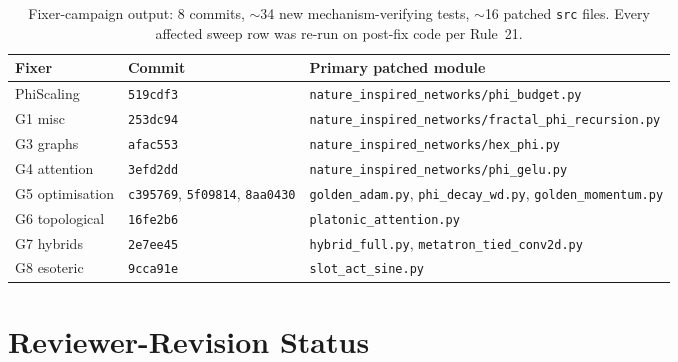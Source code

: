 \documentclass{article}
\begin{document}
\begin{table}[h!]
\small\centering
\caption{Fixer-campaign output: 8 commits, $\sim$34 new
mechanism-verifying tests, $\sim$16 patched \texttt{src} files. Every
affected sweep row was re-run on post-fix code per Rule~21.}
\label{tab:fixers}
\begin{tabular}{l l l}
\toprule
Fixer & Commit & Primary patched module \\
\midrule
PhiScaling     & \texttt{519cdf3} & \texttt{nature\_inspired\_networks/phi\_budget.py} \\
G1 misc        & \texttt{253dc94} & \texttt{nature\_inspired\_networks/fractal\_phi\_recursion.py} \\
G3 graphs      & \texttt{afac553} & \texttt{nature\_inspired\_networks/hex\_phi.py} \\
G4 attention   & \texttt{3efd2dd} & \texttt{nature\_inspired\_networks/phi\_gelu.py} \\
G5 optimisation & \texttt{c395769}, \texttt{5f09814}, \texttt{8aa0430} & \texttt{golden\_adam.py}, \texttt{phi\_decay\_wd.py}, \texttt{golden\_momentum.py} \\
G6 topological & \texttt{16fe2b6} & \texttt{platonic\_attention.py} \\
G7 hybrids     & \texttt{2e7ee45} & \texttt{hybrid\_full.py}, \texttt{metatron\_tied\_conv2d.py} \\
G8 esoteric    & \texttt{9cca91e} & \texttt{slot\_act\_sine.py} \\
\bottomrule
\end{tabular}
\end{table}

\section{Reviewer-Revision Status}
\label{app:reviewers}
\end{document}
